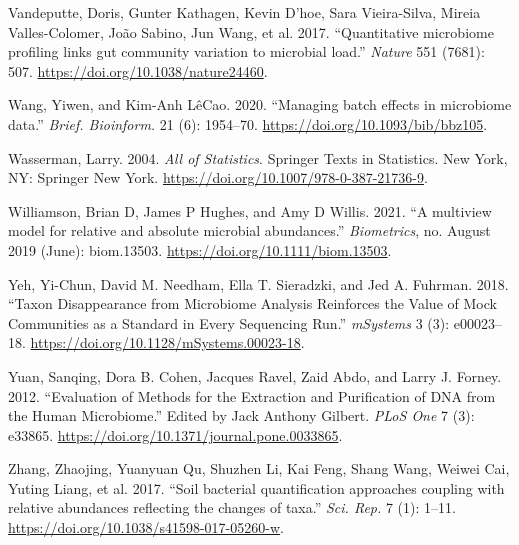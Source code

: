 \documentclass[
]{article}
\newlength{\cslhangindent}
\newlength{\cslentryspacingunit} %
\newenvironment{CSLReferences}[2] %
 {%
  \setlength{\parindent}{0pt}
  \ifodd #1
  \let\oldpar\par
  \def\par{\hangindent=\cslhangindent\oldpar}
  \fi
  \setlength{\parskip}{#2\cslentryspacingunit}
 }%
 {}
\begin{document}
\begin{CSLReferences}{1}{0}
\leavevmode{}%
Vandeputte, Doris, Gunter Kathagen, Kevin D'hoe, Sara Vieira-Silva, Mireia Valles-Colomer, João Sabino, Jun Wang, et al. 2017. {``{Quantitative microbiome profiling links gut community variation to microbial load}.''} \emph{Nature} 551 (7681): 507. \url{https://doi.org/10.1038/nature24460}.

\leavevmode{}%
Wang, Yiwen, and Kim-Anh LêCao. 2020. {``{Managing batch effects in microbiome data}.''} \emph{Brief. Bioinform.} 21 (6): 1954--70. \url{https://doi.org/10.1093/bib/bbz105}.

\leavevmode{}%
Wasserman, Larry. 2004. \emph{{All of Statistics}}. Springer Texts in Statistics. New York, NY: Springer New York. \url{https://doi.org/10.1007/978-0-387-21736-9}.

\leavevmode{}%
Williamson, Brian D, James P Hughes, and Amy D Willis. 2021. {``{A multiview model for relative and absolute microbial abundances}.''} \emph{Biometrics}, no. August 2019 (June): biom.13503. \url{https://doi.org/10.1111/biom.13503}.

\leavevmode{}%
Yeh, Yi-Chun, David M. Needham, Ella T. Sieradzki, and Jed A. Fuhrman. 2018. {``{Taxon Disappearance from Microbiome Analysis Reinforces the Value of Mock Communities as a Standard in Every Sequencing Run}.''} \emph{mSystems} 3 (3): e00023--18. \url{https://doi.org/10.1128/mSystems.00023-18}.

\leavevmode{}%
Yuan, Sanqing, Dora B. Cohen, Jacques Ravel, Zaid Abdo, and Larry J. Forney. 2012. {``{Evaluation of Methods for the Extraction and Purification of DNA from the Human Microbiome}.''} Edited by Jack Anthony Gilbert. \emph{PLoS One} 7 (3): e33865. \url{https://doi.org/10.1371/journal.pone.0033865}.

\leavevmode{}%
Zhang, Zhaojing, Yuanyuan Qu, Shuzhen Li, Kai Feng, Shang Wang, Weiwei Cai, Yuting Liang, et al. 2017. {``{Soil bacterial quantification approaches coupling with relative abundances reflecting the changes of taxa}.''} \emph{Sci. Rep.} 7 (1): 1--11. \url{https://doi.org/10.1038/s41598-017-05260-w}.

\end{CSLReferences}
\end{document}
